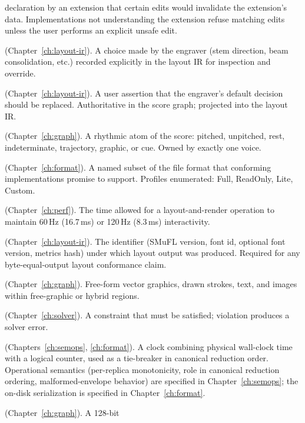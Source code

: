\documentclass[11pt,letterpaper]{report}
\begin{document}
\begin{description}
    declaration by an extension that certain edits would
    invalidate the extension's data. Implementations not
    understanding the extension refuse matching edits unless the
    user performs an explicit unsafe edit.
  \item[Engraving decision] (Chapter~\ref{ch:layout-ir}). A choice
    made by the engraver (stem direction, beam consolidation, etc.)
    recorded explicitly in the layout IR for inspection and
    override.
  \item[Engraving override] (Chapter~\ref{ch:layout-ir}). A user
    assertion that the engraver's default decision should be
    replaced. Authoritative in the score graph; projected into the
    layout IR.
  \item[Event] (Chapter~\ref{ch:graph}). A rhythmic atom of the
    score: pitched, unpitched, rest, indeterminate, trajectory,
    graphic, or cue. Owned by exactly one voice.
  \item[Format profile] (Chapter~\ref{ch:format}). A named subset
    of the file format that conforming implementations promise to
    support. Profiles enumerated: Full, ReadOnly, Lite, Custom.
  \item[Frame budget] (Chapter~\ref{ch:perf}). The time allowed for
    a layout-and-render operation to maintain 60\,Hz (16.7\,ms) or
    120\,Hz (8.3\,ms) interactivity.
  \item[Glyph catalog identity] (Chapter~\ref{ch:layout-ir}). The
    identifier (SMuFL version, font id, optional font version,
    metrics hash) under which layout output was produced.
    Required for any byte-equal-output layout conformance claim.
  \item[Graphic content] (Chapter~\ref{ch:graph}). Free-form vector
    graphics, drawn strokes, text, and images within free-graphic
    or hybrid regions.
  \item[Hard constraint] (Chapter~\ref{ch:solver}). A constraint
    that must be satisfied; violation produces a solver error.
  \item[Hybrid logical clock] (Chapters~\ref{ch:semops},
    \ref{ch:format}). A clock combining physical wall-clock
    time with a logical counter, used as a tie-breaker in
    canonical reduction order. Operational semantics
    (per-replica monotonicity, role in canonical reduction
    ordering, malformed-envelope behavior) are specified in
    Chapter~\ref{ch:semops}; the on-disk serialization is
    specified in Chapter~\ref{ch:format}.
  \item[Identifier (typed)] (Chapter~\ref{ch:graph}). A 128-bit

\end{description}
\end{document}
